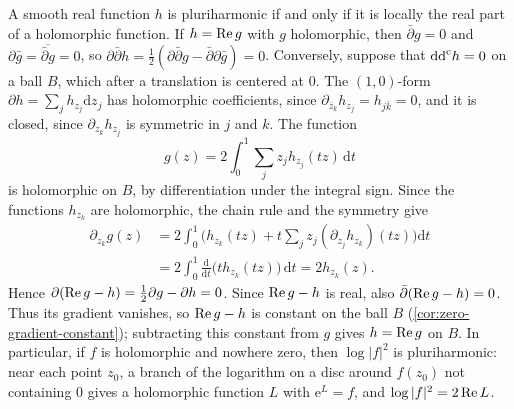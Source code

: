 
A smooth real function $h$ is pluriharmonic if and only if it is locally the real part of a holomorphic function. If $h=\operatorname{Re} g$ with $g$ holomorphic, then $\bar\partial g=0$ and $\partial\bar g=\overline{\bar\partial g}=0$, so $\partial\bar\partial h=\frac12(\partial\bar\partial g-\bar\partial\partial\bar g)=0$. Conversely, suppose that $\mathrm{dd}^{\mathrm{c}} h=0$ on a ball $B$, which after a translation is centered at $0$. The $(1,0)$-form $\partial h=\sum_jh_{z_j}\mathrm dz_j$ has holomorphic coefficients, since $\partial_{\bar z_k}h_{z_j}=h_{j\bar k}=0$, and it is closed, since $\partial_{z_k}h_{z_j}$ is symmetric in $j$ and $k$. The function
\[
 g(z)=2\int_0^1\sum_j z_jh_{z_j}(tz)\,\mathrm{d}t
\]
is holomorphic on $B$, by differentiation under the integral sign. Since the functions $h_{z_k}$ are holomorphic, the chain rule and the symmetry give
\begin{align*}
 \partial_{z_k}g(z)&=2\int_0^1\Big(h_{z_k}(tz)+t\sum_jz_j(\partial_{z_j}h_{z_k})(tz)\Big)\mathrm dt\\
 &=2\int_0^1\frac{\mathrm d}{\mathrm dt}\big(th_{z_k}(tz)\big)\,\mathrm dt=2h_{z_k}(z).
\end{align*}
Hence $\partial(\operatorname{Re} g-h)=\frac12\partial g-\partial h=0$. Since $\operatorname{Re} g-h$ is real, also $\bar\partial(\operatorname{Re} g-h)=0$. Thus its gradient vanishes, so $\operatorname{Re} g-h$ is constant on the ball $B$ (\cref{cor:zero-gradient-constant}); subtracting this constant from $g$ gives $h=\operatorname{Re} g$ on $B$. In particular, if $f$ is holomorphic and nowhere zero, then $\log|f|^2$ is pluriharmonic: near each point $z_0$, a branch of the logarithm on a disc around $f(z_0)$ not containing $0$ gives a holomorphic function $L$ with $\mathrm e^L=f$, and $\log|f|^2=2\operatorname{Re} L$.

